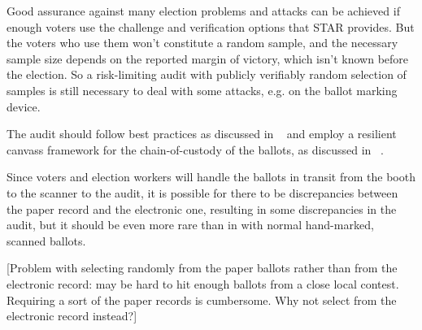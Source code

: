 \label{sec:audit}

Good assurance against many election problems and attacks can be achieved if enough voters use the challenge and verification options that STAR provides.  But the voters who use them won't constitute a random sample, and the necessary sample size depends on the reported margin of victory, which isn't known before the election.  So a risk-limiting audit with publicly verifiably random selection of samples is still necessary to deal with some attacks, e.g. on the ballot marking device.

The audit should follow best practices as discussed in ~\cite{lindemanStark12} and employ a resilient canvass framework for the chain-of-custody of the ballots, as discussed in ~\cite{starkWagner12}.

Since voters and election workers will handle the ballots in transit from the booth to the scanner to the audit, it is possible for there to be discrepancies between the paper record and the electronic one, resulting in some discrepancies in the audit, but it should be even more rare than in with normal hand-marked, scanned ballots.

[Problem with  selecting randomly from the paper ballots rather than from the electronic record: may be hard to hit enough ballots from a close local contest.  Requiring a sort of the paper records is cumbersome.  Why not select from the electronic record instead?]

